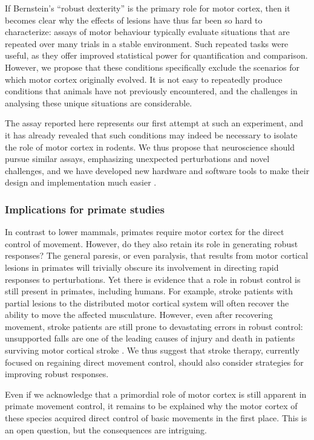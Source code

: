 If Bernstein’s ``robust dexterity'' is the primary role for motor cortex, then it becomes clear why the effects of lesions have thus far been so hard to characterize: assays of motor behaviour typically evaluate situations that are repeated over many trials in a stable environment. Such repeated tasks were useful, as they offer improved statistical power for quantification and comparison. However, we propose that these conditions specifically exclude the scenarios for which motor cortex originally evolved. It is not easy to repeatedly produce conditions that animals have not previously encountered, and the challenges in analysing these unique situations are considerable.

The assay reported here represents our first attempt at such an experiment, and it has already revealed that such conditions may indeed be necessary to isolate the role of motor cortex in rodents. We thus propose that neuroscience should pursue similar assays, emphasizing unexpected perturbations and novel challenges, and we have developed new hardware and software tools to make their design and implementation much easier \cite{Lopes2015a}.

\subsubsection*{Implications for primate studies}

In contrast to lower mammals, primates require motor cortex for the direct control of movement. However, do they also retain its role in generating robust responses? The general paresis, or even paralysis, that results from motor cortical lesions in primates will trivially obscure its involvement in directing rapid responses to perturbations. Yet there is evidence that a role in robust control is still present in primates, including humans. For example, stroke patients with partial lesions to the distributed motor cortical system will often recover the ability to move the affected musculature. However, even after recovering movement, stroke patients are still prone to devastating errors in robust control: unsupported falls are one of the leading causes of injury and death in patients surviving motor cortical stroke \cite{Jacobs2014}. We thus suggest that stroke therapy, currently focused on regaining direct movement control, should also consider strategies for improving robust responses.

Even if we acknowledge that a primordial role of motor cortex is still apparent in primate movement control, it remains to be explained why the motor cortex of these species acquired direct control of basic movements in the first place. This is an open question, but the consequences are intriguing.


